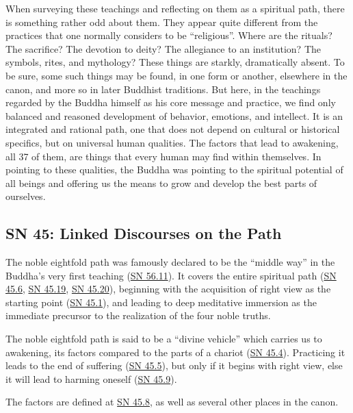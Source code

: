 \documentclass[12pt,openany]{book}%
\begin{document}
When surveying these teachings and reflecting on them as a spiritual path, there is something rather odd about them. They appear quite different from the practices that one normally considers to be “religious”. Where are the rituals? The sacrifice? The devotion to deity? The allegiance to an institution? The symbols, rites, and mythology? These things are starkly, dramatically absent. To be sure, some such things may be found, in one form or another, elsewhere in the canon, and more so in later Buddhist traditions. But here, in the teachings regarded by the Buddha himself as his core message and practice, we find only balanced and reasoned development of behavior, emotions, and intellect. It is an integrated and rational path, one that does not depend on cultural or historical specifics, but on universal human qualities. The factors that lead to awakening, all 37 of them, are things that every human may find within themselves. In pointing to these qualities, the Buddha was pointing to the spiritual potential of all beings and offering us the means to grow and develop the best parts of ourselves.

\subsection*{SN 45: Linked Discourses on the Path}

The noble eightfold path was famously declared to be the “middle way” in the Buddha’s very first teaching (\href{https://suttacentral.net/sn56.11}{SN 56.11}). It covers the entire spiritual path (\href{https://suttacentral.net/sn45.6}{SN 45.6}, \href{https://suttacentral.net/sn45.19}{SN 45.19}, \href{https://suttacentral.net/sn45.20}{SN 45.20}), beginning with the acquisition of right view as the starting point (\href{https://suttacentral.net/sn45.1}{SN 45.1}), and leading to deep meditative immersion as the immediate precursor to the realization of the four noble truths.

The noble eightfold path is said to be a “divine vehicle” which carries us to awakening, its factors compared to the parts of a chariot (\href{https://suttacentral.net/sn45.4}{SN 45.4}). Practicing it leads to the end of suffering (\href{https://suttacentral.net/sn45.5}{SN 45.5}), but only if it begins with right view, else it will lead to harming oneself (\href{https://suttacentral.net/sn45.9}{SN 45.9}).

The factors are defined at \href{https://suttacentral.net/sn45.8}{SN 45.8}, as well as several other places in the canon.
\end{document}
